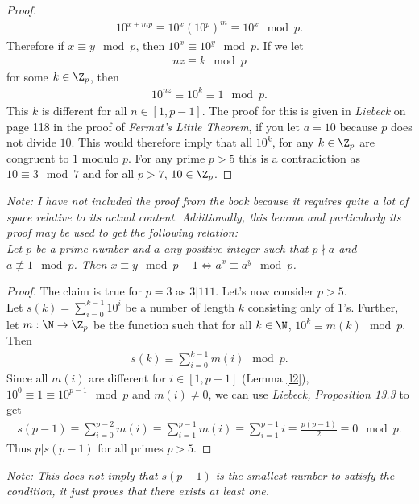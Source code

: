 \documentclass{article}
\begin{document}
\begin{adjustwidth}{2em}{2em}
\begin{proof}
\begin{align*}
      10^{x+mp}\equiv 10^{x}\left(10^{p}\right)^m\equiv 10^{x}\mod p.
    \end{align*}    
    Therefore if $x\equiv y \mod p$, then $10^x\equiv 10^y\mod p$. If we let
    \begin{align*}
      nz \equiv k \mod p
    \end{align*}
    for some $k\in\Z_p$, then
    \begin{align*}
      10^{nz}\equiv 10^{k} \equiv 1 \mod p.
    \end{align*}
   This $k$ is different for all $n\in[1,p-1]$. The proof for this is given in \emph{Liebeck} on page 118 in the proof of \emph{Fermat's Little Theorem}, if you let $a=10$ because $p$ does not divide $10$. This would therefore imply that all $10^k$, for any $k\in\Z_p$ are congruent to $1$ modulo $p$. For any prime $p>5$ this is a contradiction as $10\equiv 3 \mod 7$ and for all $p>7$, $10\in\Z_p$.
  \end{proof}
  \emph{Note: I have not included the proof from the book because it requires quite a lot of space relative to its actual content. 
  Additionally, this lemma and particularly its proof may be used to get the following relation:\\
  Let $p$ be a prime number and $a$ any positive integer such that $p\nmid a$ and $a\not\equiv 1 \mod p$. Then $x\equiv y \mod p-1 \Leftrightarrow a^x\equiv a^y \mod p$.}
\end{adjustwidth}
\begin{proof}
  The claim is true for $p=3$ as $3|111$. Let's now consider $p>5$.\\
  Let $s(k)=\sum_{i=0}^{k-1} 10^i$ be a number of length $k$ consisting only of $1$'s.
  Further, let $m:\N\to\Z_p$ be the function such that for all $k\in\N$, $10^k\equiv m(k)\mod p$. Then
  \begin{align*}
    s(k) \equiv \sum_{i=0}^{k-1} m(i) \mod p.
  \end{align*}
  Since all $m(i)$ are different for $i\in[1,p-1]$ (Lemma \ref{l2}), $10^0\equiv 1\equiv 10^{p-1}\mod p$ and $m(i)\not=0$, we can use \emph{Liebeck, Proposition 13.3} to get
  \begin{align*}
    s(p-1)
    \equiv \sum_{i=0}^{p-2}m(i)
    \equiv \sum_{i=1}^{p-1}m(i)
    \equiv \sum_{i=1}^{p-1} i 
    \equiv \frac{p(p-1)}{2}
    \equiv 0 \mod p.
  \end{align*}
  Thus $p|s(p-1)$ for all primes $p>5$.
\end{proof}
\emph{Note: This does not imply that $s(p-1)$ is the smallest number to satisfy the condition, it just proves that there exists at least one.}
\end{document}
